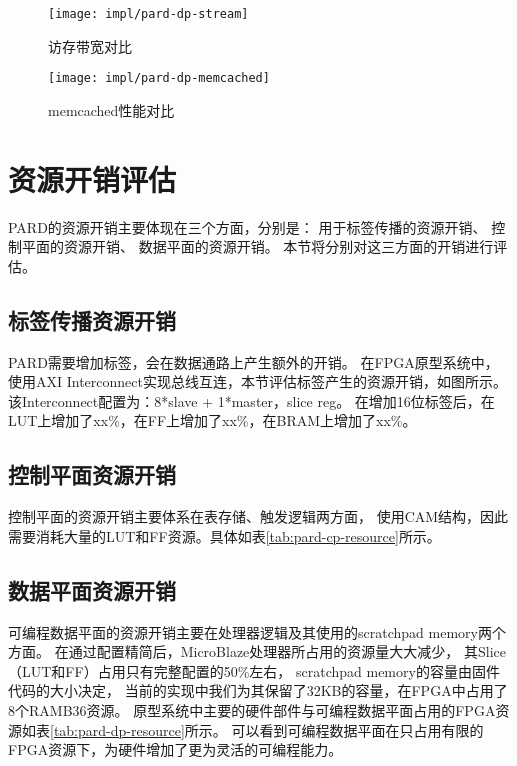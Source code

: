 \begin{figure}[tb]
\begin{minipage}{0.48\textwidth}
  \centering
  \texttt{[image: impl/pard-dp-stream]}
  \caption{访存带宽对比}
  \label{fig:pard-dp-stream}
\end{minipage}\hfill
\begin{minipage}{0.48\textwidth}
  \centering
  \texttt{[image: impl/pard-dp-memcached]}
  \caption{memcached性能对比}
  \label{fig:pard-dp-memcached}
\end{minipage}
\end{figure}


\section{资源开销评估}

PARD的资源开销主要体现在三个方面，分别是：
用于标签传播的资源开销、
控制平面的资源开销、
数据平面的资源开销。
本节将分别对这三方面的开销进行评估。

\subsection{标签传播资源开销}

PARD需要增加标签，会在数据通路上产生额外的开销。
在FPGA原型系统中，使用AXI Interconnect实现总线互连，本节评估标签产生的资源开销，如图所示。
该Interconnect配置为：8*slave + 1*master，slice reg。
在增加16位标签后，在LUT上增加了xx\%，在FF上增加了xx\%，在BRAM上增加了xx\%。

\subsection{控制平面资源开销}

控制平面的资源开销主要体系在表存储、触发逻辑两方面，
使用CAM结构，因此需要消耗大量的LUT和FF资源。具体如表\ref{tab:pard-cp-resource}所示。


\subsection{数据平面资源开销}

可编程数据平面的资源开销主要在处理器逻辑及其使用的scratchpad memory两个方面。
在通过配置精简后，MicroBlaze处理器所占用的资源量大大减少，
其Slice（LUT和FF）占用只有完整配置的50\%左右，
scratchpad memory的容量由固件代码的大小决定，
当前的实现中我们为其保留了32KB的容量，在FPGA中占用了8个RAMB36资源。
原型系统中主要的硬件部件与可编程数据平面占用的FPGA资源如表\ref{tab:pard-dp-resource}所示。
可以看到可编程数据平面在只占用有限的FPGA资源下，为硬件增加了更为灵活的可编程能力。

